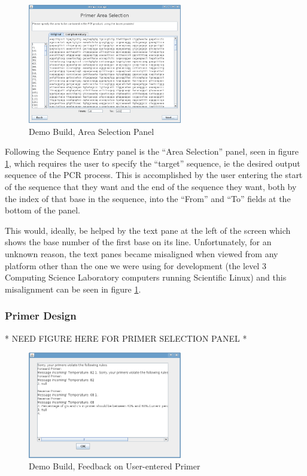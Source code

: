 \begin{figure}[h]
  \begin{center}
    \includegraphics[width=0.6\textwidth]{./images/demoBuild/areaSelection.png}
    \caption{
      \label{fig:demoBuild:areaSelection}
      Demo Build, Area Selection Panel
    }
  \end{center}
\end{figure}

Following the Sequence Entry panel is the ``Area Selection'' panel,
seen in figure \ref{fig:demoBuild:areaSelection}, which requires the
user to specify the ``target'' sequence, ie the desired output
sequence of the PCR process.
This is accomplished by the user entering the start of the sequence
that they want and the end of the sequence they want, both by the
index of that base in the sequence, into the ``From'' and ``To''
fields at the bottom of the panel.

This would, ideally, be helped by the text pane at the left of the
screen which shows the base number of the first base on its line.
Unfortunately, for an unknown reason, the text panes became misaligned
when viewed from any platform other than the one we were using for
development (the level 3 Computing Science Laboratory computers
running Scientific Linux) and this misalignment can be seen in figure
\ref{fig:demoBuild:areaSelection}.


\subsubsection{Primer Design}

* NEED FIGURE HERE FOR PRIMER SELECTION PANEL *


\begin{figure}[h]
  \begin{center}
    \includegraphics[width=0.6\textwidth]{./images/demoBuild/primerFeedback.png}
    \caption{
      \label{fig:demoBuild:primerFeedback}
      Demo Build, Feedback on User-entered Primer
    }
  \end{center}
\end{figure}


